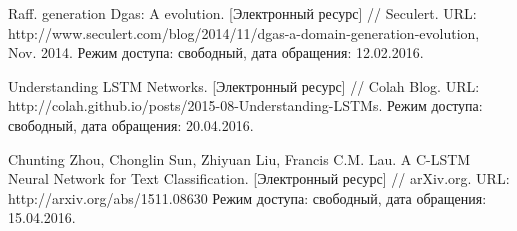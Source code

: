 \begin{thebibliography}{00}
    Raff. generation Dgas: A evolution.
    [Электронный ресурс] // Seculert.
    URL: http://www.seculert.com/blog/2014/11/dgas-a-domain-generation-evolution, Nov. 2014.
    Режим доступа: свободный, дата обращения: 12.02.2016.

    Understanding LSTM Networks. [Электронный ресурс] // Colah Blog.
    URL: http://colah.github.io/posts/2015-08-Understanding-LSTMs.
    Режим доступа: свободный, дата обращения: 20.04.2016.

    Chunting Zhou, Chonglin Sun, Zhiyuan Liu, Francis C.M. Lau.
    A C-LSTM Neural Network for Text Classification. [Электронный ресурс] // arXiv.org.
    URL: http://arxiv.org/abs/1511.08630
    Режим доступа: свободный, дата обращения: 15.04.2016.

\end{thebibliography}
\endgroup

\clearpage
